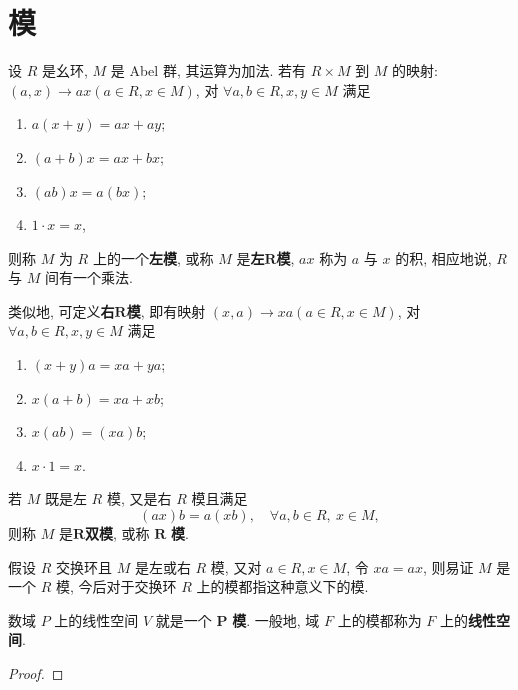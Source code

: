 \documentclass[../../main.tex]{subfiles}
\begin{document}
\section{模}

\begin{definition}[模]
设 \( R \) 是幺环, \( M \) 是 Abel 群, 其运算为加法. 若有 \( R \times M \) 到 \( M \) 的映射: \( (a,x) \to ax (a \in R, x \in M) \), 对 \( \forall a,b \in R, x,y \in M \) 满足
\begin{enumerate}[(1)]
\item \( a(x + y) = ax + ay \);
\item \( (a + b)x = ax + bx \);
\item \( (ab)x = a(bx) \);
\item \( 1 \cdot x = x \),
\end{enumerate}
则称 \( M \) 为 \( R \) 上的一个\textbf{左模}, 或称 \( M \) 是\textbf{左}\(\boldsymbol{R}\)\textbf{模}, \( ax \) 称为 \( a \) 与 \( x \) 的积, 相应地说, \( R \) 与 \( M \) 间有一个乘法.

类似地, 可定义\textbf{右}\(\boldsymbol{R}\)\textbf{模}, 即有映射 \( (x,a) \to xa (a \in R, x \in M) \), 对 \( \forall a,b \in R, x,y \in M \) 满足
\begin{enumerate}[(1)]
\item \( (x + y)a = xa + ya \);
\item \( x(a + b) = xa + xb \);
\item \( x(ab) = (xa)b \);
\item \( x \cdot 1 = x \).
\end{enumerate}

若 \( M \) 既是左 \( R \) 模, 又是右 \( R \) 模且满足
\[
(ax)b = a(xb), \quad \forall a,b \in R, \ x \in M,
\]
则称 \( M \) 是\(\boldsymbol{R}\)\textbf{双模}, 或称 \( \boldsymbol{R} \) \textbf{模}.
\end{definition}
\begin{remark}
假设 \( R \) 交换环且 \( M \) 是左或右 \( R \) 模, 又对 \( a \in R, x \in M \), 令 \( xa = ax \), 则易证 \( M \) 是一个 \( R \) 模, 今后对于交换环 \( R \) 上的模都指这种意义下的模.
\end{remark}

\begin{example}
数域 \( P \) 上的线性空间 \( V \) 就是一个 \( \boldsymbol{P} \) \textbf{模}. 一般地, 域 \( F \) 上的模都称为 \( F \) 上的\textbf{线性空间}.
\end{example}
\begin{proof}

\end{proof}
\end{document}
